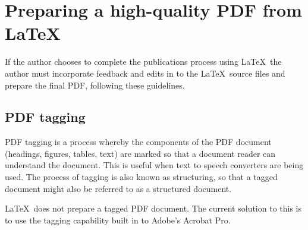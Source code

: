 \documentclass[12pt,letterpaper]{report}
\begin{document}
\chapter{Preparing a high-quality PDF from LaTeX\label{sec:PDFprep}}
If the author chooses to complete the publications process using \LaTeX\, the author must incorporate feedback and edits in to the \LaTeX\ source files and prepare the final PDF, following these guidelines.

\section{PDF tagging\label{sec:PDFtagging}}
PDF tagging is a process whereby the components of the PDF document (headings, figures, tables, text) are marked so that a document reader can understand the document. This is useful when text to speech converters are being used. The process of tagging is also known as structuring, so that a tagged document might also be referred to as a structured document.

\LaTeX\ does not prepare a tagged PDF document. The current solution to this is to use the tagging capability built in to Adobe's Acrobat Pro.
\end{document}
